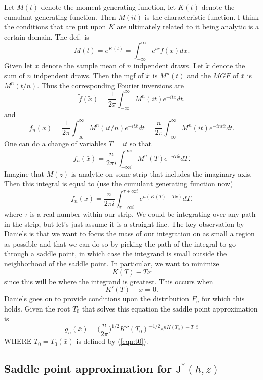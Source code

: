 \documentclass[12pt]{article}
\newcommand{\JJ}{\mbox{J}^*}
\begin{document}
Let $M(t)$ denote the moment generating function, let $K(t)$ denote the cumulant
generating function.  Then $M(it)$ is the characteristic function.  I think the
conditions that are put upon $K$ are ultimately related to it being analytic is
a certain domain.  The def.\ is
\[
M(t) = e^{K(t)} = \int_{-\infty}^\infty e^{tx} f(x) dx.
\]
Given let $\bar x$ denote the sample mean of $n$ indpendent draws.  Let $\tilde
x$ denote the sum of $n$ indpendent draws.  Then the mgf of $\tilde x$ is
$M^n(t)$ and the $MGF$ of $\bar x$ is $M^n(t/n)$.  Thus the corresponding
Fourier inversions are
\[
\tilde f(\tilde x) = \frac{1}{2\pi} \int_{-\infty}^{\infty} M^n(i t) e^{-i t
  \tilde x} dt.
\]
and
\[
f_n(\bar x) = \frac{1}{2 \pi} \int_{-\infty}^{\infty} M^n(i t/n) e^{-i t \bar x}
d t 
=  \frac{n}{2 \pi} \int_{-\infty}^{\infty} M^n(i t) e^{-i n t \bar x}
d t .
\]
One can do a change of variables $T = it$ so that
\[
f_n(\bar x) = \frac{n}{2 \pi i} \int_{-\infty i}^{\infty i} M^n(T) e^{-n T \bar x} dT.
\]
Imagine that $M(z)$ is analytic on some strip that includes the imaginary axis.
Then this integral is equal to (use the cumulant generating function now)
\[
f_n(\bar x) = \frac{n}{2 \pi i} \int_{\tau -\infty i}^{\tau + \infty i} e^{n (
  K(T) - T \bar x)} dT.
\]
where $\tau$ is a real number within our strip.  We could be integrating over
any path in the strip, but let's just assume it is a straight line.  The key
observation by Daniels is that we want to focus the mass of our integration on
as small a region as possible and that we can do so by picking the path of the
integral to go through a saddle point, in which case the integrand is small
outside the neighborhood of the saddle point.  In particular, we want to minimize
\[
K(T) - T \bar x
\]
since this will be where the integrand is greatest.  This occurs when
\begin{equation}
\label{eqn:t0}
K'(T) - \bar x = 0.
\end{equation}
Daniels goes on to provide conditions upon the distribution $F_n$ for which this
holds.  Given the root $T_0$ that solves this equation the saddle point
approximation is
\[
g_n(\bar x) = \Big( \frac{n}{2 \pi} \Big)^{1/2} K''(T_0)^{-1/2} e^{n K(T_0) - T_0
  \bar x}
\]
WHERE $T_0 = T_0(\bar x)$ is defined by (\ref{eqn:t0}).

\subsection{Saddle point approximation for $\JJ(h,z)$}
\end{document}
